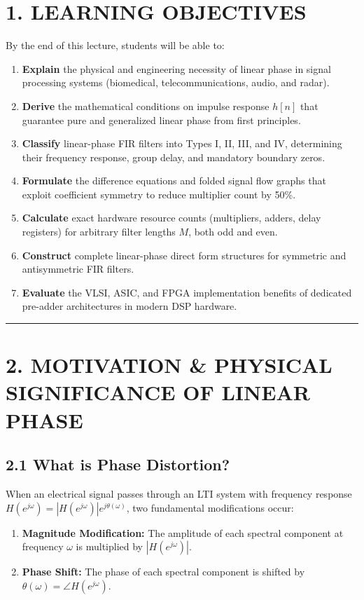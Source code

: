 \documentclass[11pt,a4paper]{article}
\begin{document}
\section{1. LEARNING OBJECTIVES}
By the end of this lecture, students will be able to:
\begin{enumerate}
    \item \textbf{Explain} the physical and engineering necessity of linear phase in signal processing systems (biomedical, telecommunications, audio, and radar).
    \item \textbf{Derive} the mathematical conditions on impulse response $h[n]$ that guarantee pure and generalized linear phase from first principles.
    \item \textbf{Classify} linear-phase FIR filters into Types I, II, III, and IV, determining their frequency response, group delay, and mandatory boundary zeros.
    \item \textbf{Formulate} the difference equations and folded signal flow graphs that exploit coefficient symmetry to reduce multiplier count by 50\%.
    \item \textbf{Calculate} exact hardware resource counts (multipliers, adders, delay registers) for arbitrary filter lengths $M$, both odd and even.
    \item \textbf{Construct} complete linear-phase direct form structures for symmetric and antisymmetric FIR filters.
    \item \textbf{Evaluate} the VLSI, ASIC, and FPGA implementation benefits of dedicated pre-adder architectures in modern DSP hardware.
\end{enumerate}

\noindent\rule{\textwidth}{0.5pt}

\section{2. MOTIVATION \& PHYSICAL SIGNIFICANCE OF LINEAR PHASE}

\subsection{2.1 What is Phase Distortion?}
When an electrical signal passes through an LTI system with frequency response $H(e^{j\omega}) = |H(e^{j\omega})| e^{j\theta(\omega)}$, two fundamental modifications occur:
\begin{enumerate}
    \item \textbf{Magnitude Modification:} The amplitude of each spectral component at frequency $\omega$ is multiplied by $|H(e^{j\omega})|$.
    \item \textbf{Phase Shift:} The phase of each spectral component is shifted by $\theta(\omega) = \angle H(e^{j\omega})$.
\end{enumerate}
\end{document}
